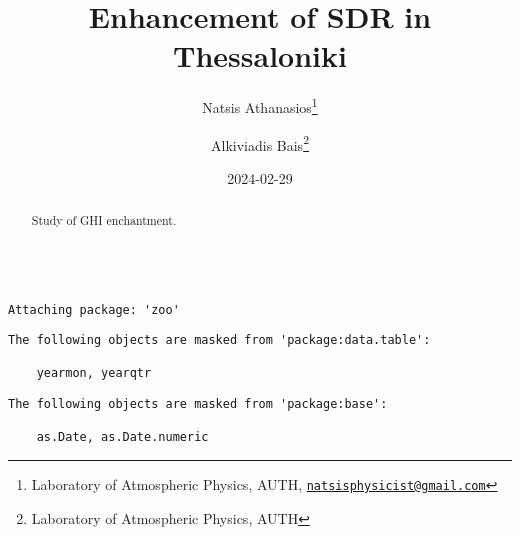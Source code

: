 \documentclass[
  10pt,
  a4paper,oneside]{article}
\title{Enhancement of SDR in Thessaloniki}
\author{Natsis Athanasios\footnote{Laboratory of Atmospheric Physics, AUTH, \href{mailto:natsisphysicist@gmail.com}{\nolinkurl{natsisphysicist@gmail.com}}} \and Alkiviadis Bais\footnote{Laboratory of Atmospheric Physics, AUTH}}
\date{2024-02-29}
\begin{document}
\maketitle
\begin{abstract}
Study of GHI enchantment.
\end{abstract}

{
\hypersetup{linkcolor=}
\setcounter{tocdepth}{4}
\tableofcontents
}
\begin{verbatim}

Attaching package: 'zoo'
\end{verbatim}

\begin{verbatim}
The following objects are masked from 'package:data.table':

    yearmon, yearqtr
\end{verbatim}

\begin{verbatim}
The following objects are masked from 'package:base':

    as.Date, as.Date.numeric
\end{verbatim}
\end{document}

